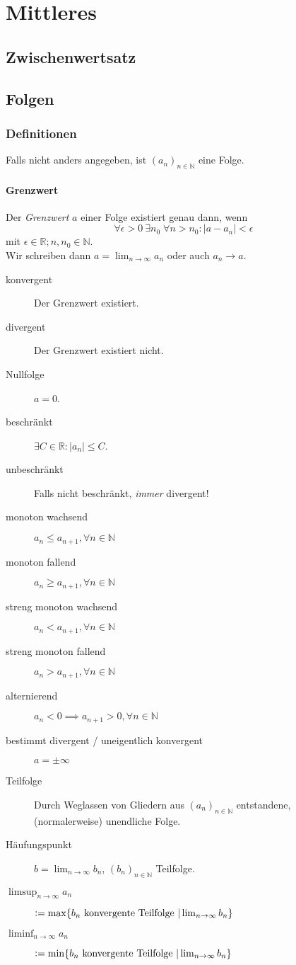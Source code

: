 \documentclass[a4paper, 9pt, DIV=24]{scrartcl}
\newcommand{\N}{\mathbb{N}}
\newcommand{\R}{\mathbb{R}}
\newcommand{\defeq}{\vcentcolon=}
\begin{document}
\clearpage
\section{Mittleres}

\subsection{Zwischenwertsatz}
\subsection{Folgen}
\subsubsection{Definitionen}
Falls nicht anders angegeben, ist $(a_n)_{n\in\N}$ eine Folge.
\paragraph{Grenzwert}Der \emph{Grenzwert} $a$ einer Folge existiert genau dann,
wenn 
\[ \forall \epsilon > 0 \: \exists n_0 \; \forall n > n_0: |a - a_n| < \epsilon \]
mit $ \epsilon \in \R; n,n_0 \in\N  $. \\
Wir schreiben dann $a = \lim_{n\rightarrow\infty} a_n$ oder auch $a_n \rightarrow a$.
\begin{description}
 \item[konvergent] Der Grenzwert existiert.
 \item[divergent] Der Grenzwert existiert nicht.
 \item[Nullfolge] $a = 0$.
 \item[beschränkt] $\exists C\in\R: |a_n| \leq C$.
 \item[unbeschränkt] Falls nicht beschränkt, \emph{immer} divergent!
 \item[monoton wachsend] $a_n \leq a_{n+1}, \forall{n\in\N}$
 \item[monoton fallend] $a_n \geq a_{n+1}, \forall{n\in\N}$
 \item[streng monoton wachsend] $a_n < a_{n+1}, \forall{n\in\N}$
 \item[streng monoton fallend] $a_n > a_{n+1}, \forall{n\in\N}$
 \item[alternierend] $a_n < 0 \implies a_{n+1} > 0, \forall{n\in\N}$
 \item[bestimmt divergent / uneigentlich konvergent] $a = \pm \infty$
 \item[Teilfolge] Durch Weglassen von Gliedern aus $(a_n)_{n\in\N}$ entstandene, (normalerweise) unendliche Folge.
 \item[Häufungspunkt] $b = \lim_{n\rightarrow\infty} b_n$, $(b_n)_{n\in\N}$ Teilfolge.
 \item[$\limsup_{n\to\infty}a_n$]$\defeq\max\{b_n\text{ konvergente Teilfolge } | \lim_{n\rightarrow\infty} b_n\}$
 \item[$\liminf_{n\to\infty}a_n$]$\defeq\min\{b_n\text{ konvergente Teilfolge } | \lim_{n\rightarrow\infty} b_n\}$
\end{description}
\end{document}
